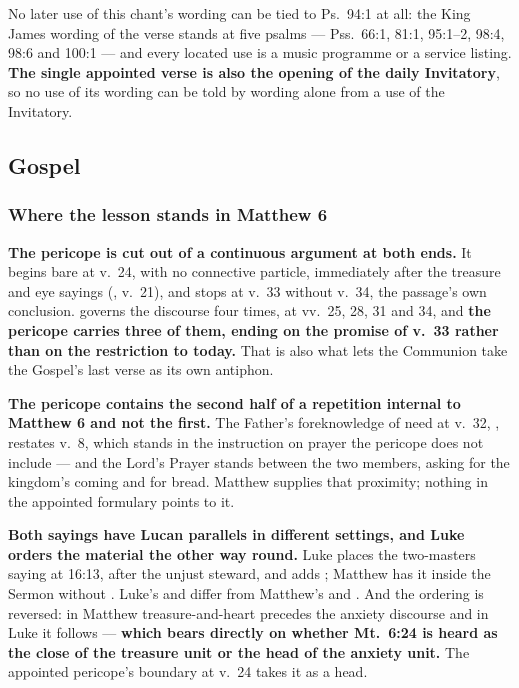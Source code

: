 No later use of this chant's wording can be tied to Ps.~94:1 at all: the King
James wording of the verse stands at five psalms --- Pss.\ 66:1, 81:1, 95:1--2,
98:4, 98:6 and 100:1 --- and every located use is a music programme or a
service listing. \textbf{The single
appointed verse is also the opening of the daily Invitatory}, so no use of its
wording can be told by wording alone from a use of the Invitatory.

\elementguard
\subsection*{Gospel }


\subsubsection*{Where the lesson stands in Matthew 6}

\textbf{The pericope is cut out of a continuous argument at both ends.} It
begins bare at v.~24, with no connective particle, immediately after the
treasure and eye sayings (, v.~21), and stops at v.~33 without v.~34, the passage's own conclusion.
 governs the discourse four times, at vv.~25, 28, 31 and 34,
and \textbf{the pericope carries three of them, ending on the promise of v.~33
rather than on the restriction to today.} That is also what lets the Communion take the
Gospel's last verse as its own antiphon.

\textbf{The pericope contains the second half of a repetition internal to
Matthew 6 and not the first.} The Father's foreknowledge of need at v.~32,
, restates v.~8, which stands in the instruction on
prayer the pericope does not include --- and the Lord's Prayer stands between the
two members, asking for the kingdom's coming and for bread. Matthew supplies
that proximity; nothing in the appointed formulary points to it.

\textbf{Both sayings have Lucan parallels in different settings, and Luke orders
the material the other way round.} Luke places the two-masters saying at 16:13,
after the unjust steward, and adds ; Matthew has it inside the
Sermon without . Luke's  and  differ from Matthew's  and . And the
ordering is reversed: in Matthew treasure-and-heart precedes the anxiety
discourse and in Luke it follows --- \textbf{which bears directly on whether
Mt.\ 6:24 is heard as the close of the treasure unit or the head of the anxiety
unit.} The appointed pericope's boundary at v.~24 takes it as a head.

